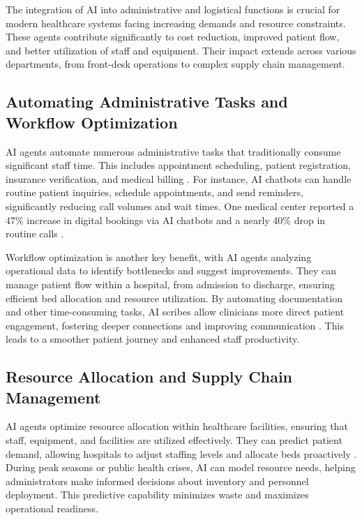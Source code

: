 \documentclass[12pt,a4paper]{article}
\begin{document}
The integration of AI into administrative and logistical functions is crucial for modern healthcare systems facing increasing demands and resource constraints. These agents contribute significantly to cost reduction, improved patient flow, and better utilization of staff and equipment. Their impact extends across various departments, from front-desk operations to complex supply chain management.

\subsection{Automating Administrative Tasks and Workflow Optimization}
\label{subsec:administrative-automation}
AI agents automate numerous administrative tasks that traditionally consume significant staff time. This includes appointment scheduling, patient registration, insurance verification, and medical billing \cite{televox_patient_engagement}. For instance, AI chatbots can handle routine patient inquiries, schedule appointments, and send reminders, significantly reducing call volumes and wait times. One medical center reported a 47\% increase in digital bookings via AI chatbots and a nearly 40\% drop in routine calls \cite{televox_patient_engagement}.

Workflow optimization is another key benefit, with AI agents analyzing operational data to identify bottlenecks and suggest improvements. They can manage patient flow within a hospital, from admission to discharge, ensuring efficient bed allocation and resource utilization. By automating documentation and other time-consuming tasks, AI scribes allow clinicians more direct patient engagement, fostering deeper connections and improving communication \cite{deepscribe_ai_medical_scribe}. This leads to a smoother patient journey and enhanced staff productivity.

\subsection{Resource Allocation and Supply Chain Management}
\label{subsec:resource-allocation}
AI agents optimize resource allocation within healthcare facilities, ensuring that staff, equipment, and facilities are utilized effectively. They can predict patient demand, allowing hospitals to adjust staffing levels and allocate beds proactively \cite{jll_commercial_real_estate}. During peak seasons or public health crises, AI can model resource needs, helping administrators make informed decisions about inventory and personnel deployment. This predictive capability minimizes waste and maximizes operational readiness.
\end{document}
